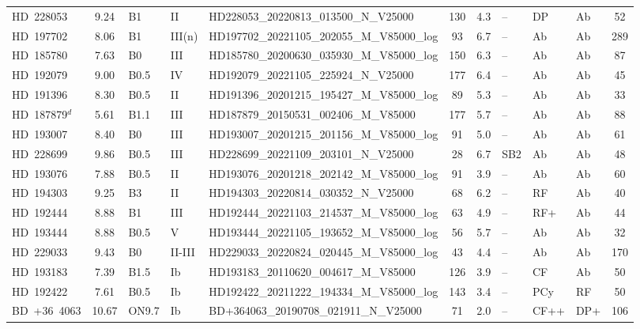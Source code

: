 {\begin{landscape}
\begin{longtable}{lclllcclllc}
\noalign{\smallskip}
HD~228053 & 9.24 & B1 & II & HD228053\_20220813\_013500\_N\_V25000 & 130 & 4.3 & -- & DP & Ab & 52 \\
\noalign{\smallskip}
HD~197702 & 8.06 & B1 & III(n) & HD197702\_20221105\_202055\_M\_V85000\_log & 93 & 6.7 & -- & Ab & Ab & 289 \\
\noalign{\smallskip}
HD~185780 & 7.63 & B0 & III & HD185780\_20200630\_035930\_M\_V85000\_log & 150 & 6.3 & -- & Ab & Ab & 87 \\
\noalign{\smallskip}
HD~192079 & 9.00 & B0.5 & IV & HD192079\_20221105\_225924\_N\_V25000 & 177 & 6.4 & -- & Ab & Ab & 45 \\
\noalign{\smallskip}
HD~191396 & 8.30 & B0.5 & II & HD191396\_20201215\_195427\_M\_V85000\_log & 89 & 5.3 & -- & Ab & Ab & 33 \\
\noalign{\smallskip}
HD~187879$^{d}$ & 5.61 & B1.1 & III & HD187879\_20150531\_002406\_M\_V85000 & 177 & 5.7 & -- & Ab & Ab & 88 \\
\noalign{\smallskip}
HD~193007 & 8.40 & B0 & III & HD193007\_20201215\_201156\_M\_V85000\_log & 91 & 5.0 & -- & Ab & Ab & 61 \\
\noalign{\smallskip}
HD~228699 & 9.86 & B0.5 & III & HD228699\_20221109\_203101\_N\_V25000 & 28 & 6.7 & SB2 & Ab & Ab & 48 \\
\noalign{\smallskip}
HD~193076 & 7.88 & B0.5 & II & HD193076\_20201218\_202142\_M\_V85000\_log & 91 & 3.9 & -- & Ab & Ab & 60 \\
\noalign{\smallskip}
HD~194303 & 9.25 & B3 & II & HD194303\_20220814\_030352\_N\_V25000 & 68 & 6.2 & -- & RF & Ab & 40 \\
\noalign{\smallskip}
HD~192444 & 8.88 & B1 & III & HD192444\_20221103\_214537\_M\_V85000\_log & 63 & 4.9 & -- & RF+ & Ab & 44 \\
\noalign{\smallskip}
HD~193444 & 8.88 & B0.5 & V & HD193444\_20221105\_193652\_M\_V85000\_log & 56 & 5.7 & -- & Ab & Ab & 32 \\
\noalign{\smallskip}
HD~229033 & 9.43 & B0 & II-III & HD229033\_20220824\_020445\_M\_V85000\_log & 43 & 4.4 & -- & Ab & Ab & 170 \\
\noalign{\smallskip}
HD~193183 & 7.39 & B1.5 & Ib & HD193183\_20110620\_004617\_M\_V85000 & 126 & 3.9 & -- & CF & Ab & 50 \\
\noalign{\smallskip}
HD~192422 & 7.61 & B0.5 & Ib & HD192422\_20211222\_194334\_M\_V85000\_log & 143 & 3.4 & -- & PCy & RF & 50 \\
\noalign{\smallskip}
BD~+36~4063 & 10.67 & ON9.7 & Ib & BD+364063\_20190708\_021911\_N\_V25000 & 71 & 2.0 & -- & CF++ & DP+ & 106 \\

\end{longtable}
\end{landscape}}
